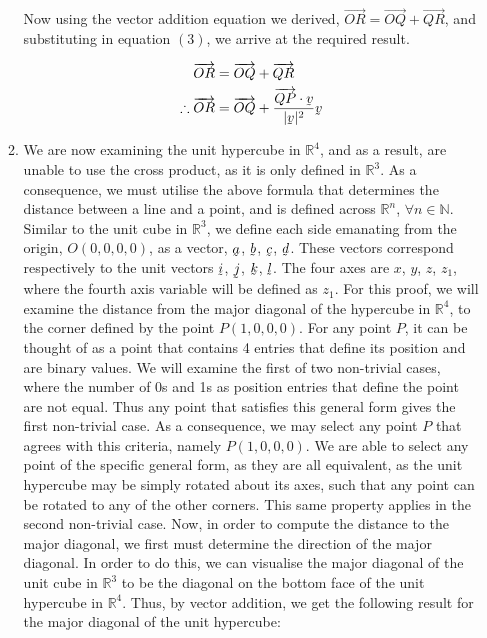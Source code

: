 \documentclass[a4paper]{article}
\begin{document}
\begin{enumerate}[label=\textbf{\arabic*.}]
\begin{enumerate}
		Now using the vector addition equation we derived, $\overrightarrow{OR} = \overrightarrow{OQ} + \overrightarrow{QR}$, and substituting in equation $(3)$, we arrive at the required result.

		\begin{align*}
		\overrightarrow{OR} & = \overrightarrow{OQ} + \overrightarrow{QR}\\
		\therefore \overrightarrow{OR} & = \overrightarrow{OQ} + \frac{\overrightarrow{QP}\cdot{\underaccent{\tilde}{v}}}{|\underaccent{\tilde}{v}|^2}\underaccent{\tilde}{v}\\
		\end{align*}

		\item We are now examining the unit hypercube in $\mathbb{R}^4$, and as a result, are unable to use the cross product, as it is only defined in $\mathbb{R}^3$. As a consequence, we must utilise the above formula that determines the distance between a line and a point, and is defined across $\mathbb{R}^n$, $\forall n \in \mathbb{N}$. 
		\bigbreak
		Similar to the unit cube in $\mathbb{R}^3$, we define each side emanating from the origin, $O(0,0,0,0)$, as a vector, $\underaccent{\tilde}{a}$, $\underaccent{\tilde}{b}$, $\underaccent{\tilde}{c}$, $\underaccent{\tilde}{d}$. These vectors correspond respectively to the unit vectors $\underaccent{\tilde}{i}$, $\underaccent{\tilde}{j}$, $\underaccent{\tilde}{k}$, $\underaccent{\tilde}{l}$. The four axes are $x$, $y$, $z$, $z_1$, where the fourth axis variable will be defined as $z_1$.
		\bigbreak
		For this proof, we will examine the distance from the major diagonal of the hypercube in $\mathbb{R}^4$, to the corner defined by the point $P(1,0,0,0)$. For any point $P$, it can be thought of as a point that contains 4 entries that define its position and are binary values. We will examine the first of two non-trivial cases, where the number of 0s and 1s as position entries that define the point are not equal. Thus any point that satisfies this general form gives the first non-trivial case. As a consequence, we may select any point $P$ that agrees with this criteria, namely $P(1,0,0,0)$. We are able to select any point of the specific general form, as they are all equivalent, as the unit hypercube may be simply rotated about its axes, such that any point can be rotated to any of the other corners. This same property applies in the second non-trivial case.
		\bigbreak
		Now, in order to compute the distance to the major diagonal, we first must determine the direction of the major diagonal. In order to do this, we can visualise the major diagonal of the unit cube in $\mathbb{R}^3$ to be the diagonal on the bottom face of the unit hypercube in $\mathbb{R}^4$. Thus, by vector addition, we get the following result for the major diagonal of the unit hypercube:


\end{enumerate}
\end{enumerate}
\end{document}
